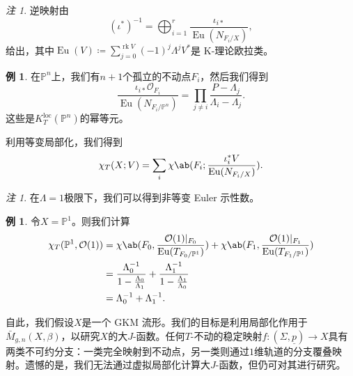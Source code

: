 \documentclass{amsart}
\theoremstyle{definition}
\newtheorem{exm}[thm]{例}
\theoremstyle{remark}
\newtheorem{rmk}[thm]{注}
\theoremstyle{plain}
\theoremstyle{definition}
\theoremstyle{remark}
\renewcommand{\P}{\mathbb{P}}
\newcommand{\mc}[1]{\mathcal{#1}}
\newcommand{\mr}[1]{\mathrm{#1}}
\newcommand{\on}[1]{\operatorname{#1}}
\newcommand{\ul}[1]{\underline{#1}}
\newcommand{\1}{\mathbf{1}}
\newcommand{\2}{\mathbf{2}}
\newcommand{\3}{\mathbf{3}}
\newcommand{\loc}{\mr{loc}}
\begin{document}
\begin{rmk}
逆映射由
    \[ (\iota^*)^{-1} = \bigoplus_{i=1}^r \frac{\iota_{i*}}{\on{Eu}(N_{F_i/X})}, \]
给出，其中\(\on{Eu}(V) \coloneqq \sum_{j = 0}^{\on{rk} V} (-1)^j \Lambda^j V^*\)是 K-理论欧拉类。
\end{rmk}

\begin{exm}
在\(\P^n\)上，我们有\(n+1\)个孤立的不动点\(F_i\)，然后我们得到
    \[ \frac{\iota_{i*} \mc{O}_{F_i}}{\on{Eu}(N_{F_i/\P^n})} = \prod_{j \neq i} \frac{P - \Lambda_j}{\Lambda_i - \Lambda_j}. \]
这些是\(K_T^{\loc}(\P^n)\)的幂等元。
\end{exm}

利用等变局部化，我们得到
\[ \chi_T(X; V) = \sum_i \chi\ab(F_i; \frac{\iota_i^* V}{\on{Eu}(N_{F_i/X})}). \]

\begin{rmk}
在\(\Lambda = 1\)极限下，我们可以得到非等变 Euler 示性数。
\end{rmk}

\begin{exm}
令\(X = \P^1\)。则我们计算
    \begin{align*}
        \chi_T(\P^1, \mc{O}(1)) &= \chi\ab(F_0, \frac{\mc{O}(1)|_{F_0}}{\on{Eu}(T_{F_0/\P^1})}) + \chi\ab(F_1, \frac{\mc{O}(1)|_{F_1}}{\on{Eu}(T_{F_1/\P^1})}) \\
        &= \frac{\Lambda_0^{-1}}{1 - \frac{\Lambda_0}{\Lambda_1}} + \frac{\Lambda_1^{-1}}{1 - \frac{\Lambda_1}{\Lambda_0}} \\
        &= \Lambda_0^{-1} + \Lambda_1^{-1}. 
    \end{align*}
\end{exm}

自此，我们假设\(X\)是一个 GKM 流形。我们的目标是利用局部化作用于\(\bar{M}_{g,n}(X, \beta)\)，以研究\(X\)的大\(J\)-函数。任何\(T\)-不动的稳定映射\(f \colon (\Sigma, \ul{p}) \to X\)具有两类不可约分支：一类完全映射到不动点，另一类则通过\(1\)维轨道的分支覆叠映射。遗憾的是，我们无法通过虚拟局部化计算大\(J\)-函数，但仍可对其进行研究。
\end{document}
